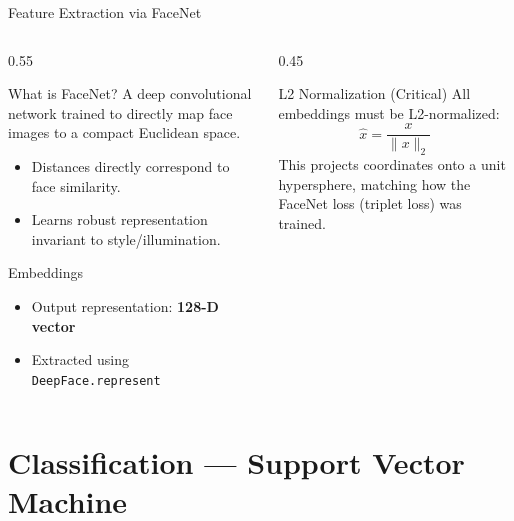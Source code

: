 \documentclass[aspectratio=169]{beamer}
\begin{document}
\begin{frame}{Feature Extraction via FaceNet}
  \begin{columns}
    \begin{column}{0.55\textwidth}
      \begin{block}{What is FaceNet?}
        A deep convolutional network trained to directly map face images to a compact Euclidean space.
        \begin{itemize}
          \item Distances directly correspond to face similarity.
          \item Learns robust representation invariant to style/illumination.
        \end{itemize}
      \end{block}
      \begin{block}{Embeddings}
        \begin{itemize}
          \item Output representation: \textbf{128-D vector}
          \item Extracted using \texttt{DeepFace.represent}
        \end{itemize}
      \end{block}
    \end{column}
    \begin{column}{0.45\textwidth}
      \begin{block}{L2 Normalization (Critical)}
        All embeddings must be L2-normalized:
        \[
        \hat{x} = \frac{x}{\|x\|_2}
        \]
        This projects coordinates onto a unit hypersphere, matching how the FaceNet loss (triplet loss) was trained.
      \end{block}
    \end{column}
  \end{columns}
\end{frame}

\section{Classification --- Support Vector Machine}
\end{document}
